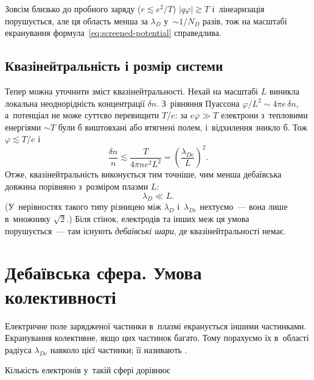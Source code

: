 Зовсім близько до пробного заряду ($r\lesssim e^2/T$) $|q\varphi|\gtrsim T$ і~лінеаризація порушується,
але ця область менша за $\lambda_D$ у~$\sim1/N_D$ разів, тож на масштабі екранування формула~\eqref{eq:screened-potential} справедлива.

\subsection*{Квазінейтральність і розмір системи}
Тепер можна уточнити зміст квазінейтральності. Нехай на масштабі $L$ виникла локальна
неоднорідність концентрації $\delta n$. З~рівняння Пуассона $\varphi/L^2\sim4\pi e\,\delta
n$, а~потенціал не може суттєво перевищити $T/e$: за $e\varphi\gg T$ електрони з~тепловими енергіями $\sim T$ були б виштовхані або втягнені полем, і~відхилення зникло б. Тож $\varphi\lesssim T/e$ і
\begin{equation*}
	\frac{\delta n}n\lesssim\frac{T}{4\pi ne^2L^2}=\left(\frac{\lambda_{De}}L\right)^2.
\end{equation*}
Отже, квазінейтральність виконується тим точніше, чим менша дебаївська довжина порівняно
з~розміром плазми $L$:
\begin{equation}\label{eq:size-condition}
	\lambda_D\ll L.
\end{equation}
(У~нерівностях такого типу різницею між $\lambda_D$ і~$\lambda_{De}$ нехтуємо~--- вона лише в~множнику $\sqrt2$.) Біля стінок, електродів та інших меж ця умова порушується~--- там існують \emph{дебаївські
шари}, де квазінейтральності немає.


\section{Дебаївська сфера. Умова колективності}\label{sec:debye-sphere}


Електричне поле зарядженої частинки в~плазмі екранується іншими частинками. Екранування
колективне, якщо цих частинок багато. Тому порахуємо їх в~області радіуса $\lambda_{De}$
навколо цієї частинки; її називають .

Кількість електронів у~такій сфері дорівнює

